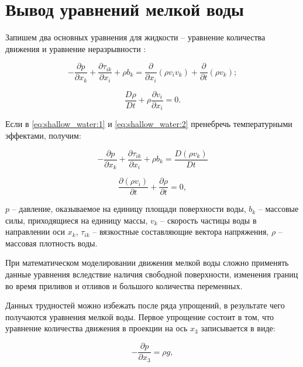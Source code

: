 \documentclass[14pt]{extreport}
\begin{document}
 
\chapter{Вывод уравнений мелкой воды}

Запишем два основных уравнения для жидкости -- уравнение количества движения и уравнение неразрывности \cite{bib:fem:konor}:

\begin{equation}\label{eq:shallow_water:1}
-\frac{\partial p}{\partial x_k} + \frac{\partial \tau_{ik}}{\partial x_i} + \rho b_k = \frac{\partial}{\partial x_i}(\rho v_i v_k) + \frac{\partial}{\partial t}(\rho v_k);
\end{equation}

\begin{equation}\label{eq:shallow_water:2}
\frac{D\rho}{Dt}+\rho \frac{\partial v_i}{\partial x_i} =0.
\end{equation}

Если в \ref{eq:shallow_water:1} и \ref{eq:shallow_water:2} пренебречь температурными эффектами, получим:

\begin{equation}\label{eq:shallow_water:3}
-\frac{\partial p}{\partial x_k} + \frac{\partial \tau_{ik}}{\partial x_i} + \rho b_k = \frac{D(\rho v_k)}{Dt}
\end{equation}

\begin{equation}\label{eq:shallow_water:4}
\frac{\partial (\rho v_i)}{\partial t} + \frac{\partial \rho}{\partial t}=0,
\end{equation}

 $p$ -- давление, оказываемое на единицу площади поверхности воды, $b_k$ -- массовые силы, приходящиеся на единицу массы, $v_k$ -- скорость частицы воды в направлении оси $x_k$, $\tau_{ik}$ -- вязкостные составляющие вектора напряжения, $\rho$ -- массовая плотность воды.

При математическом моделировании движения мелкой воды сложно применять данные уравнения вследствие наличия свободной поверхности, изменения границ во время приливов и отливов и большого количества переменных.

Данных трудностей можно избежать после ряда упрощений, в результате чего получаются уравнения мелкой воды. Первое упрощение состоит в том, что уравнение количества движения в проекции на ось $x_3$ записывается в виде:

\begin{equation}\label{eq:shallow_water:5}
-\frac{\partial p}{\partial x_3}=\rho g, 
\end{equation}
\end{document}
